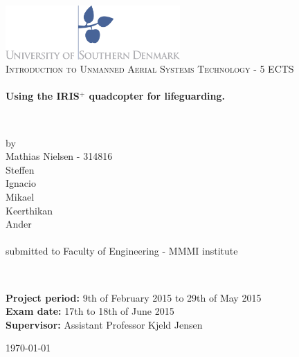 \begin{titlepage}
\begin{center}

\includegraphics[width=0.5\textwidth]{./Images/logo.jpg}~\\[2cm]


\textsc{\Large Introduction to Unmanned Aerial Systems Technology - 5 ECTS}\\[1.5cm]

\HRule \\[0.4cm]
{ \huge \bfseries Using the IRIS$^{+}$ quadcopter for lifeguarding.  \\[0.4cm] }

\HRule \\[1.5cm]


\begin{center}
\begin{minipage}{0.5\textwidth} 
\large 
\center
 by\\
\LARGE
Mathias Nielsen - 314816\\
\LARGE
Steffen\\ 
\LARGE
Ignacio\\
\LARGE
Mikael \\
\LARGE
Keerthikan \\ 
\LARGE
Ander \\
\large
~\\
submitted to Faculty of Engineering - MMMI institute 

\end{minipage}
\end{center}

~\\[3cm]

\begin{flushleft}
\begin{minipage}{1\textwidth}
\large

\textbf{Project period:} 9th of February 2015 to 29th of May 2015\\[0.3cm]
\textbf{Exam date:} 17th to 18th of June 2015\\[0.3cm]
\textbf{Supervisor:} Assistant Professor Kjeld Jensen\\

\end{minipage}

\end{flushleft}

\vfill

{\large \today}
\end{center}
\end{titlepage}